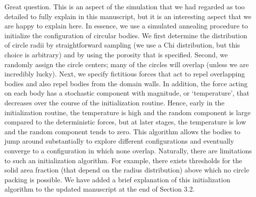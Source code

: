 \documentclass[11pt]{article}
\begin{document}
Great question. This is an aspect of the simulation that we had regarded as too detailed to fully explain in this manuscript, but it is an interesting aspect that we are happy to explain here. In essence, we use a simulated annealing procedure to initialize the configuration of circular bodies. We first determine the distribution of circle radii by straightforward sampling (we use a Chi distribution, but this choice is arbitrary) and by using the porosity that is specified. Second, we randomly assign the circle centers; many of the circles will overlap (unless we are incredibly lucky). Next, we specify fictitious forces that act to repel overlapping bodies and also repel bodies from the domain walls. In addition, the force acting on each body has a stochastic component with magnitude, or `temperature', that decreases over the course of the initialization routine. Hence, early in the initialization routine, the temperature is high and the random component is large compared to the deterministic forces, but at later stages, the temperature is low and the random component tends to zero. This algorithm allows the bodies to jump around substantially to explore different configurations and eventually converge to a configuration in which none overlap. Naturally, there are limitations to such an initialization algorithm. For example, there exists thresholds for the solid area fraction (that depend on the radius distribution) above which no circle packing is possible.
We have added a brief explanation of this initialization algorithm to the updated manuscript at the end of Section 3.2.
\end{document}
